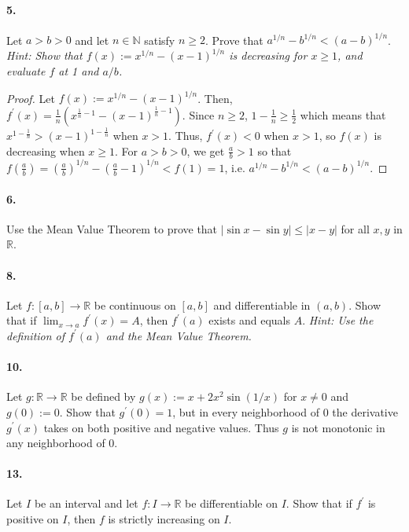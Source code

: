 \documentclass[12pt]{article}
\theoremstyle{remark}
\begin{document}
\paragraph{5.} Let $a>b>0$ and let $n \in \mathbb{N}$ satisfy $n \geq 2$. Prove that $a^{1 / n}-b^{1 / n}<(a-b)^{1 / n}$. \emph{Hint: Show that $f(x):=x^{1 / n}-(x-1)^{1 / n}$ is decreasing for $x \geq 1$, and evaluate $f$ at 1 and $a / b$.}
\begin{proof}
    Let $f(x):=x^{1 / n}-(x-1)^{1 / n}$. Then, $f^{\prime}(x)=\frac{1}{n}(x^{\frac{1}{n}-1}-(x-1)^{\frac{1}{n}-1})$. Since $n \geq 2$, $1-\frac{1}{n} \geq \frac{1}{2}$ which means that $x^{1-\frac{1}{n}}>(x-1)^{1-\frac{1}{n}}$ when $x>1$. Thus, $f^{\prime}(x)<0$ when $x>1$, so $f(x)$ is decreasing when $x \geq 1$. For $a>b>0$, we get $\frac{a}{b}>1$ so that $f(\frac{a}{b})=(\frac{a}{b})^{1 / n}-(\frac{a}{b}-1)^{1 / n}<f(1)=1$, i.e. $a^{1 / n}-b^{1 / n}<(a-b)^{1 / n}$.
\end{proof}   

\paragraph{6.} Use the Mean Value Theorem to prove that $|\sin x-\sin y| \leq |x-y|$ for all $x, y$ in $\mathbb{R}$.

\paragraph{8.} Let $f:[a, b] \rightarrow \mathbb{R}$ be continuous on $[a, b]$ and differentiable in $(a, b)$. Show that if $\lim _{x \rightarrow a} f^{\prime}(x)=A$, then $f^{\prime}(a)$ exists and equals $A$. \emph{Hint: Use the definition of $f^{\prime}(a)$ and the Mean Value Theorem.}

\paragraph{10.} Let $g: \mathbb{R} \rightarrow \mathbb{R}$ be defined by $g(x):=x+2 x^2 \sin (1 / x)$ for $x \neq 0$ and $g(0):=0$. Show that $g^{\prime}(0)=1$, but in every neighborhood of 0 the derivative $g^{\prime}(x)$ takes on both positive and negative values. Thus $g$ is not monotonic in any neighborhood of 0.

\paragraph{13.} Let $I$ be an interval and let $f: I \rightarrow \mathbb{R}$ be differentiable on $I$. Show that if $f^{\prime}$ is positive on $I$, then $f$ is strictly increasing on $I$.
\end{document}
